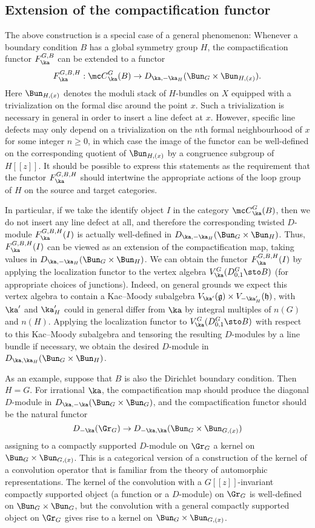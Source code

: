 \documentclass[11pt,reqno]{amsart}
\theoremstyle{plain}
\numberwithin{equation}{section}
\theoremstyle{definition}
\begin{document}
\subsection{Extension of the compactification functor}

The above construction is a special case of a general phenomenon:
Whenever a boundary condition $B$ has a global symmetry group $H$, the
compactification functor $F^{G,B}_\ka$ can be extended to a functor
$$
F^{G,B,H}_\ka: {\mc C}^G_\ka(B) \to D_{\ka,-\ka_H}(\Bun_G \times
\Bun_{H,(x)}).
$$
Here $\Bun_{H,(x)}$ denotes the moduli stack of $H$-bundles on $X$
equipped with a trivialization on the formal disc around the point
$x$. Such a trivialization is necessary in general in order to insert
a line defect at $x$. However, specific line defects may only depend
on a trivialization on the $n$th formal neighbourhood of $x$ for some
integer $n\geq 0$, in which case the image of the functor can be
well-defined on the corresponding quotient of $\Bun_{H,(x)}$ by a
congruence subgroup of $H[[z]]$. It should be possible to express this
statements as the requirement that the functor $F^{G,B,H}_\ka$ should
intertwine the appropriate actions of the loop group of $H$ on the
source and target categories.

In particular, if we take the identify object $I$ in the category
${\mc C}^G_\ka(B)$, then we do not insert any line defect at all, and
therefore the corresponding twisted $D$-module $F^{G,B,H}_\ka(I)$ is
actually well-defined in $D_{\ka,-\ka_H}(\Bun_G \times \Bun_H)$. Thus,
$F^{G,B,H}_\ka(I)$ can be viewed as an extension of the
compactification map, taking values in $D_{\ka,-\ka_H}(\Bun_G \times
\Bun_H)$. We can obtain the functor $F^{G,B,H}_\ka(I)$ by applying the
localization functor to the vertex algebra $V^G_\ka(D^G_{0,1}\sto B)$
(for appropriate choices of junctions). Indeed, on general grounds we
expect this vertex algebra to contain a Kac--Moody subalgebra
$V_{\ka'}(\mathfrak{g})\times V_{-\ka'_H}(\mathfrak{h})$, with $\ka'$
and $\ka'_H$ could in general differ from $\ka$ by integral multiples
of $n(G)$ and $n(H)$. Applying the localization functor to
$V^G_\ka(D^G_{0,1}\sto B)$ with respect to this Kac--Moody subalgebra
and tensoring the resulting $D$-modules by a line bundle if necessary,
we obtain the desired $D$-module in $D_{\ka,\ka_H}(\Bun_G \times \Bun_H)$.

As an example, suppose that $B$ is also the Dirichlet boundary
condition. Then $H=G$. For irrational $\ka$, the compactification map
should produce the diagonal $D$-module in $D_{\ka,-\ka}(\Bun_G \times
\Bun_G)$, and the compactification functor should be the natural
functor
$$
D_{-\ka}(\Gr_G) \to D_{-\ka,\ka}(\Bun_G \times \Bun_{G,(x)})
$$
assigning to a compactly supported $D$-module on $\Gr_G$ a kernel on
$\Bun_G \times \Bun_{G,(x)}$. This is a categorical version of a
construction of the kernel of a convolution operator that is familiar
from the theory of automorphic representations. The kernel of the
convolution with a $G[[z]]$-invariant compactly supported object (a
function or a $D$-module) on $\Gr_G$ is well-defined on $\Bun_G \times
\Bun_G$, but the convolution with a general compactly supported object
on $\Gr_G$ gives rise to a kernel on $\Bun_G \times \Bun_{G,(x)}$.
\end{document}
